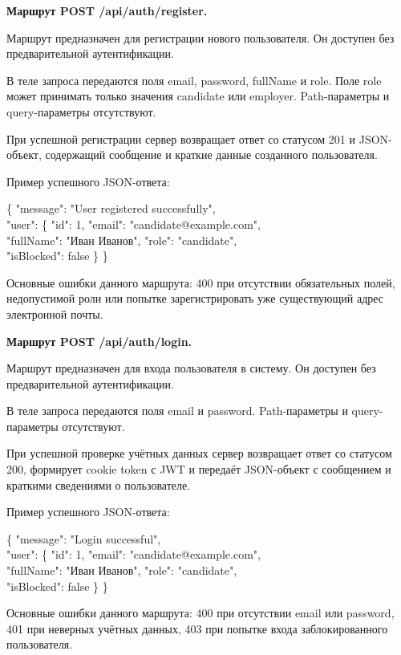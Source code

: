 \textbf{Маршрут POST /api/auth/register.}

Маршрут предназначен для регистрации нового пользователя. Он доступен без предварительной аутентификации.

В теле запроса передаются поля email, password, fullName и role. Поле role может принимать только значения candidate или employer. Path-параметры и query-параметры отсутствуют.

При успешной регистрации сервер возвращает ответ со статусом 201 и JSON-объект, содержащий сообщение и краткие данные созданного пользователя.

Пример успешного JSON-ответа:

\begin{flushleft}
	\small\ttfamily
	\{ "message": "User registered successfully",\\
	"user": \{ "id": 1, "email": "candidate@example.com",\\
	"fullName": "Иван Иванов", "role": "candidate",\\
	"isBlocked": false \} \}
\end{flushleft}

Основные ошибки данного маршрута: 400 при отсутствии обязательных полей, недопустимой роли или попытке зарегистрировать уже существующий адрес электронной почты.

\textbf{Маршрут POST /api/auth/login.}

Маршрут предназначен для входа пользователя в систему. Он доступен без предварительной аутентификации.

В теле запроса передаются поля email и password. Path-параметры и query-параметры отсутствуют.

При успешной проверке учётных данных сервер возвращает ответ со статусом 200, формирует cookie token с JWT и передаёт JSON-объект с сообщением и краткими сведениями о пользователе.

Пример успешного JSON-ответа:

\begin{flushleft}
	\small\ttfamily
	\{ "message": "Login successful",\\
	"user": \{ "id": 1, "email": "candidate@example.com",\\
	"fullName": "Иван Иванов", "role": "candidate",\\
	"isBlocked": false \} \}
\end{flushleft}

Основные ошибки данного маршрута: 400 при отсутствии email или password, 401 при неверных учётных данных, 403 при попытке входа заблокированного пользователя.

